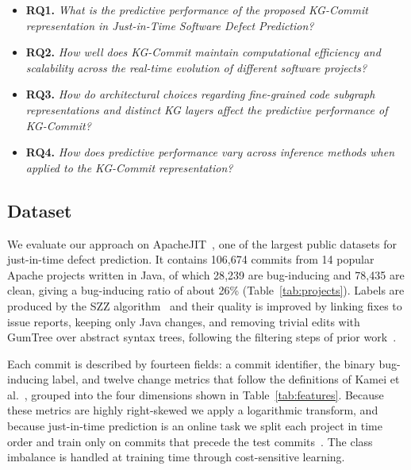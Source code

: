 \documentclass[final,5p,times,twocolumn]{elsarticle}
\theoremstyle{plain}
\begin{document}
\begin{itemize}
    \item \textbf{RQ1.} \emph{What is the predictive performance of the proposed KG-Commit representation in Just-in-Time Software Defect Prediction?}
    \vspace{1em}
    \item \textbf{RQ2.} \emph{How well does KG-Commit maintain computational efficiency and scalability across the real-time evolution of different software projects?}
    \vspace{1em}
    \item \textbf{RQ3.} \emph{How do architectural choices regarding fine-grained code subgraph representations and distinct KG layers affect the predictive performance of KG-Commit?}
    \vspace{1em}
    \item \textbf{RQ4.} \emph{How does predictive performance vary across inference methods when applied to the KG-Commit representation?}
\end{itemize}

\subsection{Dataset}
\label{sec:dataset}

We evaluate our approach on ApacheJIT~\cite{keshavarz2022apachejit}, one of the largest public datasets for just-in-time defect prediction. It contains 106{,}674 commits from 14 popular Apache projects written in Java, of which 28{,}239 are bug-inducing and 78{,}435 are clean, giving a bug-inducing ratio of about 26\% (Table~\ref{tab:projects}). Labels are produced by the SZZ algorithm~\cite{sliwerski2005changes} and their quality is improved by linking fixes to issue reports, keeping only Java changes, and removing trivial edits with GumTree over abstract syntax trees, following the filtering steps of prior work~\cite{mcintosh2018fix}.

Each commit is described by fourteen fields: a commit identifier, the binary
bug-inducing label, and twelve change metrics that follow the definitions of
Kamei et al.~\cite{kamei2013large}, grouped into the four dimensions shown in
Table~\ref{tab:features}. Because these metrics are highly right-skewed we apply
a logarithmic transform, and because just-in-time prediction is an online task we
split each project in time order and train only on commits that precede the test
commits~\cite{kamei2013large,cabral2023towards}. The class imbalance is handled at
training time through cost-sensitive learning.
\end{document}
